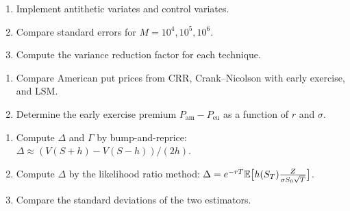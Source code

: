 \begin{exercise}
\begin{enumerate}
    \item Implement antithetic variates and control variates.
    \item Compare standard errors for $M = 10^4, 10^5, 10^6$.
    \item Compute the variance reduction factor for each technique.
\end{enumerate}
\end{exercise}

\begin{exercise}
\begin{enumerate}
    \item Compare American put prices from CRR, Crank--Nicolson with early
          exercise, and LSM.
    \item Determine the early exercise premium
          $P_{\text{am}} - P_{\text{eu}}$ as a function of $r$ and $\sigma$.
\end{enumerate}
\end{exercise}

\begin{exercise}
\begin{enumerate}
    \item Compute $\Delta$ and $\Gamma$ by bump-and-reprice:
          $\Delta \approx (V(S+h) - V(S-h))/(2h)$.
    \item Compute $\Delta$ by the likelihood ratio method:
          $\Delta = e^{-rT}\mathbb{E}\bigl[h(S_T)\frac{Z}{\sigma S_0\sqrt{T}}\bigr]$.
    \item Compare the standard deviations of the two estimators.
\end{enumerate}
\end{exercise}
